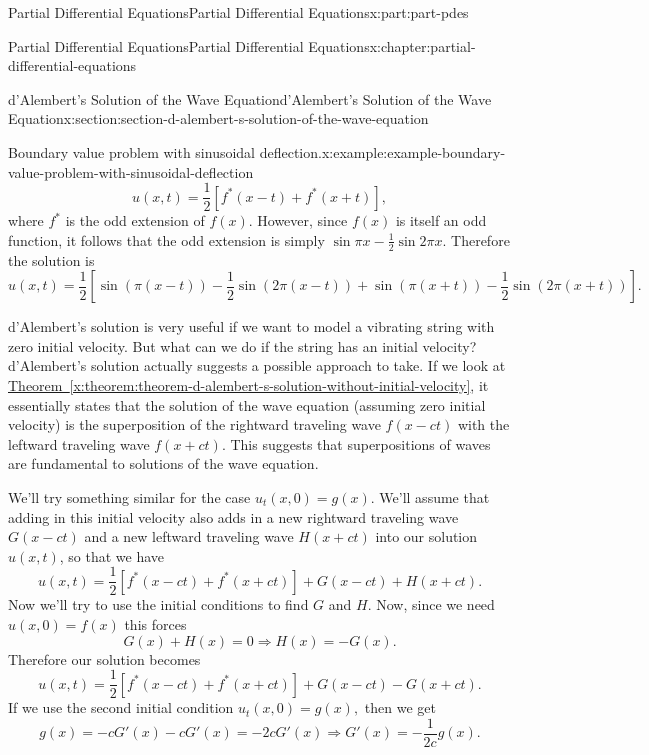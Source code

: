 \documentclass[oneside,10pt,]{book}
\newcommand{\xreffont}{\relax}
\numberwithin{equation}{part}
\begin{document}
\begin{partptx}{Partial Differential Equations}{}{Partial Differential Equations}{}{}{x:part:part-pdes}
\begin{chapterptx}{Partial Differential Equations}{}{Partial Differential Equations}{}{}{x:chapter:partial-differential-equations}
\begin{sectionptx}{d'Alembert's Solution of the Wave Equation}{}{d'Alembert's Solution of the Wave Equation}{}{}{x:section:section-d-alembert-s-solution-of-the-wave-equation}
\begin{example}{Boundary value problem with sinusoidal deflection.}{x:example:example-boundary-value-problem-with-sinusoidal-deflection}
\begin{equation*}
u(x,t) = \frac{1}{2}[f^{*}(x-t)+f^{*}(x+t)],
\end{equation*}
where \(f^{*}\) is the odd extension of \(f(x)\). However, since \(f(x)\) is itself an odd function, it follows that the odd extension is simply \(\sin\pi x-\frac{1}{2}\sin2\pi x\). Therefore the solution is%
%
\begin{equation*}
u(x,t) = \frac{1}{2}\left[\sin(\pi(x-t))-\frac{1}{2}\sin(2\pi(x-t)) + \sin(\pi(x+t)) - \frac{1}{2}\sin(2\pi(x+t))\right].
\end{equation*}
\end{example}
d'Alembert's solution is very useful if we want to model a vibrating string with zero initial velocity. But what can we do if the string has an initial velocity? d'Alembert's solution actually suggests a possible approach to take. If we look at \hyperref[x:theorem:theorem-d-alembert-s-solution-without-initial-velocity]{Theorem~{\xreffont\ref{x:theorem:theorem-d-alembert-s-solution-without-initial-velocity}}}, it essentially states that the solution of the wave equation (assuming zero initial velocity) is the superposition of the rightward traveling wave \(f(x-ct)\) with the leftward traveling wave \(f(x+ct)\). This suggests that superpositions of waves are fundamental to solutions of the wave equation.%
\par
We'll try something similar for the case \(u_{t}(x,0) = g(x)\). We'll assume that adding in this initial velocity also adds in a new rightward traveling wave \(G(x-ct)\) and a new leftward traveling wave \(H(x+ct)\) into our solution \(u(x,t)\), so that we have%
%
\begin{equation*}
u(x,t) = \frac{1}{2}[f^{*}(x-ct)+f^{*}(x+ct)] + G(x-ct) + H(x+ct).
\end{equation*}
Now we'll try to use the initial conditions to find \(G\) and \(H\). Now, since we need \(u(x,0) = f(x)\) this forces%
%
\begin{equation*}
G(x) + H(x) = 0\Rightarrow H(x) = -G(x).
\end{equation*}
Therefore our solution becomes%
\begin{equation*}
u(x,t) = \frac{1}{2}[f^{*}(x-ct)+f^{*}(x+ct)] + G(x-ct) - G(x+ct).
\end{equation*}
If we use the second initial condition \(u_{t}(x,0) = g(x),\) then we get%
\begin{equation*}
g(x) = -cG'(x) - cG'(x) = -2cG'(x) \Rightarrow G'(x) = -\frac{1}{2c}g(x).
\end{equation*}

\end{sectionptx}
\end{chapterptx}
\end{partptx}
\end{document}
